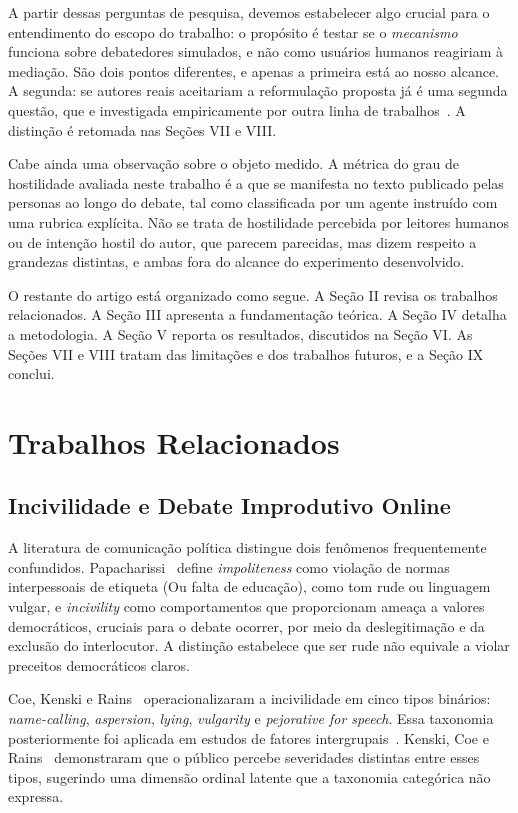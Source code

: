 \documentclass[conference]{IEEEtran} \IEEEoverridecommandlockouts %
\begin{document}
A partir dessas perguntas de pesquisa, devemos estabelecer algo crucial para o entendimento do escopo do trabalho: o propósito é testar se o
\textit{mecanismo} funciona sobre debatedores simulados, e não como usuários humanos reagiriam à mediação. São dois pontos diferentes, e apenas a primeira
está ao nosso alcance. A segunda: se autores reais aceitariam a reformulação proposta já é uma segunda questão, que e investigada empiricamente por outra linha de trabalhos~\cite{argyle2023leveraging,katsaros2022reconsidering}. A distinção é retomada nas Seções VII e VIII.

Cabe ainda uma observação sobre o objeto medido. A métrica do grau de hostilidade avaliada neste
trabalho é a que se manifesta no texto publicado pelas personas ao longo do debate, tal como classificada por um
agente instruído com uma rubrica explícita. Não se trata de hostilidade percebida por leitores humanos ou  de intenção hostil do autor, que parecem parecidas, mas dizem respeito a grandezas distintas, e ambas fora do alcance do experimento desenvolvido.

O restante do artigo está organizado como segue. A Seção II revisa os trabalhos
relacionados. A Seção III apresenta a fundamentação teórica. A Seção IV detalha
a metodologia. A Seção V reporta os resultados, discutidos na Seção VI. As
Seções VII e VIII tratam das limitações e dos trabalhos futuros, e a Seção IX
conclui.

\section{Trabalhos Relacionados}

\subsection{Incivilidade e Debate Improdutivo Online}


A literatura de comunicação política distingue dois fenômenos frequentemente confundidos. Papacharissi~\cite{papacharissi2004democracy} define
\textit{impoliteness} como violação de normas interpessoais de etiqueta (Ou falta de educação), como tom rude ou linguagem vulgar, e \textit{incivility} como comportamentos que proporcionam ameaça a valores democráticos, cruciais para o debate ocorrer, por meio da deslegitimação e da exclusão do interlocutor.
A distinção estabelece que ser rude não equivale a violar preceitos democráticos claros.

Coe, Kenski e Rains~\cite{coe2014online} operacionalizaram a incivilidade em
cinco tipos binários: \textit{name-calling}, \textit{aspersion},
\textit{lying}, \textit{vulgarity} e \textit{pejorative for speech}. Essa taxonomia posteriormente foi aplicada em estudos de fatores intergrupais~\cite{rains2017incivility}.
Kenski, Coe e Rains~\cite{kenski2020perceptions} demonstraram que o público
percebe severidades distintas entre esses tipos, sugerindo uma dimensão
ordinal latente que a taxonomia categórica não expressa.
\end{document}

